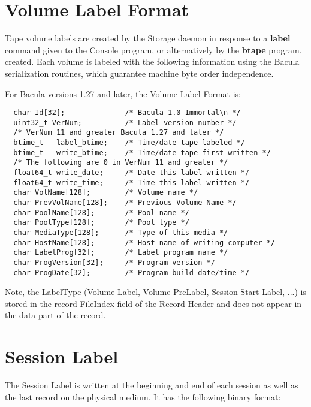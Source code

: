 \section{Volume Label Format}

Tape volume labels are created by the Storage daemon in response to a {\bf
label} command given to the Console program, or alternatively by the {\bf
btape} program. created. Each volume is labeled with the following information
using the Bacula serialization routines, which guarantee machine byte order
independence.

For Bacula versions 1.27 and later, the Volume Label Format is:

\footnotesize
\begin{verbatim}
  char Id[32];              /* Bacula 1.0 Immortal\n */
  uint32_t VerNum;          /* Label version number */
  /* VerNum 11 and greater Bacula 1.27 and later */
  btime_t   label_btime;    /* Time/date tape labeled */
  btime_t   write_btime;    /* Time/date tape first written */
  /* The following are 0 in VerNum 11 and greater */
  float64_t write_date;     /* Date this label written */
  float64_t write_time;     /* Time this label written */
  char VolName[128];        /* Volume name */
  char PrevVolName[128];    /* Previous Volume Name */
  char PoolName[128];       /* Pool name */
  char PoolType[128];       /* Pool type */
  char MediaType[128];      /* Type of this media */
  char HostName[128];       /* Host name of writing computer */
  char LabelProg[32];       /* Label program name */
  char ProgVersion[32];     /* Program version */
  char ProgDate[32];        /* Program build date/time */
\end{verbatim}
\normalsize

Note, the LabelType (Volume Label, Volume PreLabel, Session Start Label, ...)
is stored in the record FileIndex field of the Record Header and does not
appear in the data part of the record.

\section{Session Label}

The Session Label is written at the beginning and end of each session as well
as the last record on the physical medium. It has the following binary format:



